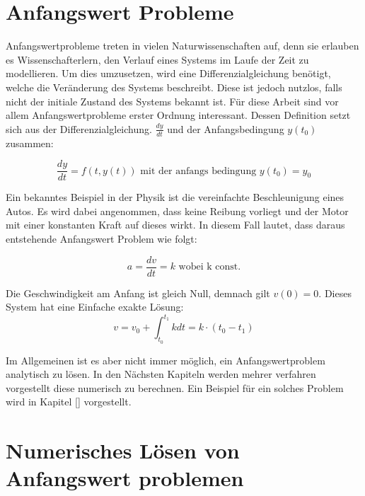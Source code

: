 
\section{Anfangswert Probleme} \label{sec:anfangswert_probleme}

Anfangswertprobleme treten in vielen Naturwissenschaften auf, denn sie erlauben es Wissenschafterlern, 
den Verlauf eines Systems im Laufe der Zeit zu modellieren.
Um dies umzusetzen, wird eine Differenzialgleichung benötigt, welche die Veränderung des Systems beschreibt.
Diese ist jedoch nutzlos, falls nicht der initiale Zustand des Systems bekannt ist.
Für diese Arbeit sind vor allem Anfangswertprobleme erster Ordnung interessant.
Dessen Definition setzt sich aus der Differenzialgleichung. $\frac{dy}{dt}$ und der Anfangsbedingung $y(t_0)$ zusammen:

$$
\frac{dy}{dt} = f(t, y(t)) \text{ mit der anfangs bedingung } y(t_0) = y_0
$$

Ein bekanntes Beispiel in der Physik ist die vereinfachte Beschleunigung eines Autos.
Es wird dabei angenommen, dass keine Reibung vorliegt und der Motor mit einer konstanten Kraft auf dieses wirkt.
In diesem Fall lautet, dass daraus entstehende Anfangswert Problem wie folgt:

$$
a = \frac{dv}{dt} = k \text{ wobei k const.}
$$

Die Geschwindigkeit am Anfang ist gleich Null, demnach gilt  $v(0) = 0$.
Dieses System hat eine Einfache exakte Lösung:
$$
v = v_0 + \int_{t_0}^{t_1} k dt = k \cdot (t_0 - t_1) 
$$

Im Allgemeinen ist es aber nicht immer möglich, 
ein Anfangswertproblem analytisch zu lösen. 
In den Nächsten Kapiteln werden mehrer verfahren vorgestellt diese numerisch zu berechnen.
Ein Beispiel für ein solches Problem wird in Kapitel \ref{} vorgestellt.

\section{Numerisches Lösen von Anfangswert problemen} \label{sec:numerisches_lösen_von_anfangswert_problemen}

